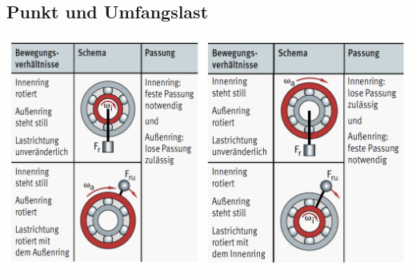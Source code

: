 \subsection{Punkt und Umfangslast}
    \begin{center}
        \includegraphics[width = 1.0\linewidth]{src/images/MAEIP_Lager_Punkt_Umfangslast.jpeg}
    \end{center}